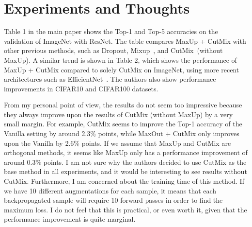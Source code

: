 \documentclass[10pt,twocolumn,letterpaper]{article}
\begin{document}
\section{Experiments and Thoughts}
Table 1 in the main paper shows the Top-1 and Top-5 accuracies on the validation of ImageNet with ResNet.
The table compares MaxUp + CutMix with other previous methods, such as Dropout, Mixup~\cite{mixup}, and CutMix~\cite{cutmix}(without MaxUp).
A similar trend is shown in Table 2, which shows the performance of MaxUp + CutMix compared to solely CutMix on ImageNet, using more recent architectures such as EfficientNet~\cite{efficientnet}.
The authors also show performance improvements in CIFAR10 and CIFAR100 datasets.

From my personal point of view, the results do not seem too impressive because they always improve upon the results of CutMix (without MaxUp) by a very small margin.
For example, CutMix seems to improve the Top-1 accuracy of the Vanilla setting by around 2.3\% points, while MaxOut + CutMix only improves upon the Vanilla by 2.6\% points.
If we assume that MaxUp and CutMix are orthogonal methods, it seems like MaxUp only has a performance improvement of around 0.3\% points.
I am not sure why the authors decided to use CutMix as the base method in all experiments, and it would be interesting to see results without CutMix.
Furthermore, I am concerned about the training time of this method.
If we have 10 different augmentations for each sample, it means that each backpropagated sample will require 10 forward passes in order to find the maximum loss.
I do not feel that this is practical, or even worth it, given that the performance improvement is quite marginal.


{\small


}
\end{document}
